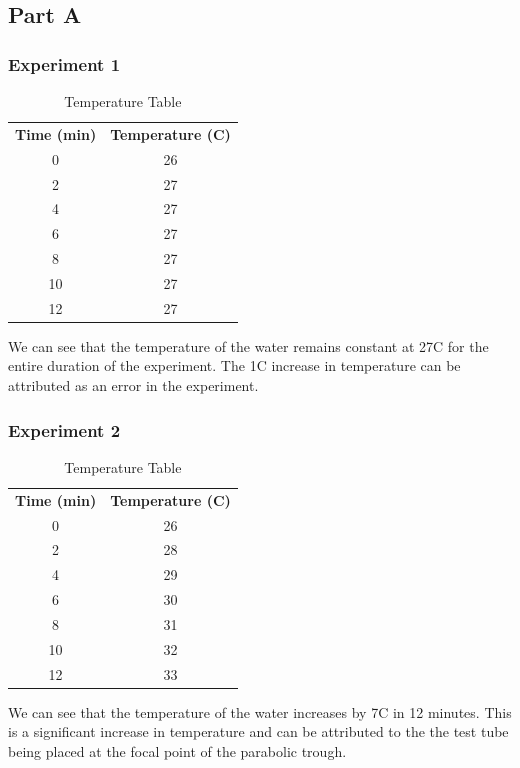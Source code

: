 \documentclass[a4paper, 12pt, english]{article}
\begin{document}
\subsection{Part A}
\subsubsection{Experiment 1}
\begin{table}[H]
	\caption{\label{tab:Table 1} Temperature Table}
	\centering
	\begin{tabular}{c c}
		\toprule
		\textbf{Time (min)}
		   & \textbf{Temperature (\degree C)} \\
		\cmidrule[0.4pt](r{0.125em}){1-1}%
		\cmidrule[0.4pt](lr{0.125em}){2-2}%
		0  & 26                               \\
		2  & 27                               \\
		4  & 27                               \\
		6  & 27                               \\
		8  & 27                               \\
		10 & 27                               \\
		12 & 27                               \\
		\bottomrule
	\end{tabular}
\end{table}
We can see that the temperature of the water remains constant at 27\degree C for the
entire duration of the experiment. The 1\degree C increase in temperature can be
attributed as an error in the experiment.

\subsubsection{Experiment 2}
\begin{table}[H]
	\caption{\label{tab:Table 2} Temperature Table}
	\centering
	\begin{tabular}{c c}
		\toprule
		\textbf{Time (min)}
		   & \textbf{Temperature (\degree C)} \\
		\cmidrule[0.4pt](r{0.125em}){1-1}%
		\cmidrule[0.4pt](lr{0.125em}){2-2}%
		0  & 26                               \\
		2  & 28                               \\
		4  & 29                               \\
		6  & 30                               \\
		8  & 31                               \\
		10 & 32                               \\
		12 & 33                               \\
		\bottomrule
	\end{tabular}
\end{table}
We can see that the temperature of the water increases by 7\degree C in 12 minutes.
This is a significant increase in temperature and can be attributed to the
the test tube being placed at the focal point of the parabolic trough.
\end{document}
